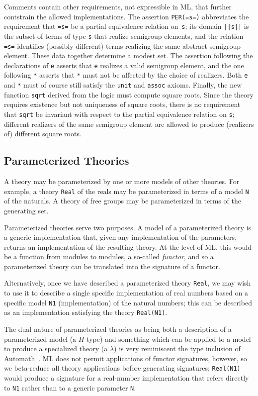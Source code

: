 Comments contain other requirements, not expressible in ML, that
further contstrain the allowed implementations. The assertion
\Verb|PER(=s=)| abbreviates the requirement that \Verb|=s=| be a
partial equivalence relation on~\Verb|s|; its domain \Verb+||s||+ is
the subset of terms of type \Verb|s| that realize semigroup
elements, and the relation \Verb|=s=| identifies (possibly different)
terms realizing the same abstract semigroup element. These data
together determine a modest set. The assertion following the
declarations of \Verb|e| asserts that \Verb|e| realizes a valid
semigroup element, and the one following \Verb|*| asserts that
\Verb|*| must not be affected by the choice of realizers. Both
\Verb|e| and \Verb|*| must of course still satisfy the \Verb|unit| and
\Verb|assoc| axioms. Finally, the new function \Verb|sqrt| derived
from the logic must compute square roots. Since the theory requires
existence but not uniqueness of square roots, there is no requirement
that \Verb|sqrt| be invariant with respect to the partial equivalence
relation on \Verb|s|; different realizers of the same semigroup
element are allowed to produce (realizers of) different square roots.


\subsection{Parameterized Theories}
\label{sec:param-theor-funct}

A theory may be parameterized by one or more models of other theories.
For example, a theory \Verb|Real| of the reals may be parameterized in
terms of a model \Verb|N| of the naturals.  A theory of free groups may be
parameterized in terms of the generating set.

Parameterized theories serve two purposes.  A model of a
parameterized theory is a generic implementation that, given any
implementation of the parameters, returns an implementation of the
resulting theory.  At the level of ML, this would be a function from
modules to modules, a so-called \emph{functor}, and so a
parameterized theory can be translated into the signature of a
functor.

Alternatively, once we have described a parameterized theory
\Verb|Real|, we may wish to use it to describe a single specific
implementation of real numbers based on a specific model \Verb|N1|
(implementation) of the natural numbers; this can be described as
an implementation satisfying the theory \Verb|Real(N1)|.

The dual nature of parameterized theories as being both a description
of a parameterized model (a $\Pi$ type) and something which can be
applied to a model to produce a specialized theory (a $\lambda$) is
very reminiscent the type inclusion of Automath~\cite{automath}.  ML
does not permit applications of functor signatures, however, so we
beta-reduce all theory applications before generating signatures;
\Verb|Real(N1)| would produce a signature for a real-number
implementation that refers directly to \Verb|N1| rather than to a
generic parameter \Verb|N|.


